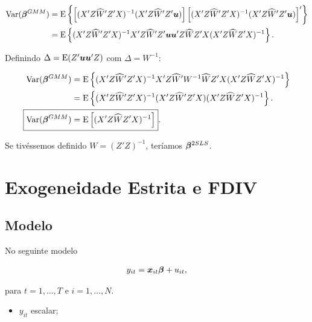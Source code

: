 \documentclass[11pt, oneside, a4paper, article]{article}
\numberwithin{equation}{section}
\begin{document}
\begin{description}
\vspace{-1 em}
\begin{align*}
\text{Var}( \boldsymbol{\beta}^{GMM} ) &=
\text{E} \left\{ 
\left[ ( X' Z \widehat{W}' Z' X )^{-1} ( X' Z \widehat{W}' Z' \boldsymbol{u} ) \right]
\left[ ( X' Z \widehat{W}' Z' X )^{-1} ( X' Z \widehat{W}' Z' \boldsymbol{u} ) \right]'
\right\}
\\ &=
\text{E} \left\{ 
( X' Z \widehat{W}' Z' X )^{-1}
X' Z \widehat{W}' Z' \boldsymbol{u} \boldsymbol{u}' Z \widehat{W} Z' X 
( X' Z \widehat{W} Z' X )^{-1}
\right\}.
\end{align*}

\noindent
Definindo $\Delta = \text{E}(Z' \boldsymbol{u}\boldsymbol{u}' Z)$ com $\Delta = W^{-1}$:

\vspace{-1 em}
\begin{align*}
\Var( \betavec^{GMM} ) &=
\E \left\{ 
( X' Z \widehat{W}' Z' X )^{-1}
X' Z \widehat{W}' W^{-1} \widehat{W} Z' X 
( X' Z \widehat{W} Z' X )^{-1}
\right\}
\\ &=
\E \left\{ 
( X' Z \widehat{W}' Z' X )^{-1}
( X' Z \widehat{W}' Z' X )
( X' Z \widehat{W} Z' X )^{-1}
\right\}.
\\
\Aboxed{
\Var( \betavec^{GMM} ) &=
\E \left[
( X' Z \widehat{W} Z' X )^{-1}
\right] }.
\end{align*}

\noindent
Se tivéssemos definido $W = (Z'Z)^{-1}$, teríamos $\boldsymbol{\beta}^{2SLS}$.


\clearpage
\section{Exogeneidade Estrita e FDIV}


\subsection{Modelo}

No seguinte modelo

\vspace{-1 em}
	\begin{align*} 
		y_{it} = \boldsymbol{x}_{it} \boldsymbol{\beta} + u_{it},
	\end{align*}

	\noindent
	para
	$t = 1, \dots, T$ e $i = 1, \dots, N$.

	\begin{itemize}\itemsep0pt
		\item
			$y_{it}$ escalar;


\end{itemize}
\end{description}
\end{document}
